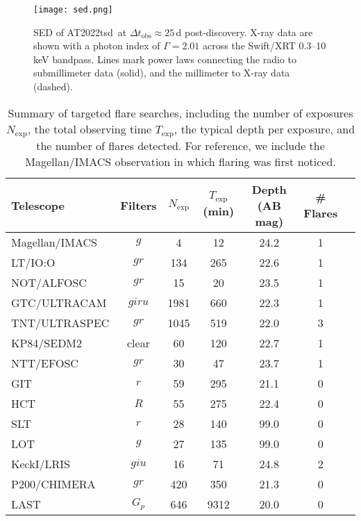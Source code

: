 \documentclass{nature_plusfigure}
\newcommand{\at}{AT2022tsd}
\begin{document}
\begin{extended_data}
\begin{figure}[!ht]
 \centering
\texttt{[image: sed.png]}
  \caption{SED of \at\ at $\Delta t_\mathrm{obs}\approx25\,$d post-discovery. X-ray data are shown with a photon index of $\Gamma=2.01$ across the Swift/XRT 0.3--10\,keV bandpass. Lines mark power laws connecting the radio to submillimeter data (solid), and the millimeter to X-ray data (dashed).}
 \label{fig:full-sed}
\end{figure}

\begin{table}
\begin{center}
\caption{Summary of targeted flare searches, including the number of exposures $N_\mathrm{exp}$, the total observing time $T_\mathrm{exp}$, the typical depth per exposure, and the number of flares detected. For reference, we include the Magellan/IMACS observation in which flaring was first noticed.}
\label{tab:flare-searches}
\begin{tabular}{lcccccc} 
\hline\hline
Telescope & Filters & $N_\mathrm{exp}$ & $T_\mathrm{exp}$ (min) & Depth (AB mag) & \# Flares \\
\hline
Magellan/IMACS & $g$ & 4 & 12 & 24.2 & 1 \\
LT/IO:O & $gr$ & 134 & 265 & 22.6 & 1 \\
NOT/ALFOSC & $gr$ & 15 & 20 & 23.5 & 1 \\
GTC/ULTRACAM & $giru$ & 1981 & 660 & 22.3 & 1 \\
TNT/ULTRASPEC & $gr$ & 1045 & 519 & 22.0 & 3 \\
KP84/SEDM2 & clear & 60 & 120 & 22.7 & 1 \\
NTT/EFOSC & $gr$ & 30 & 47 & 23.7 & 1 \\
GIT & $r$ & 59 & 295 & 21.1 & 0 \\
HCT & $R$ & 55 & 275 & 22.4 & 0 \\
SLT & $r$ & 28 & 140 & 99.0 & 0 \\
LOT & $g$ & 27 & 135 & 99.0 & 0 \\
KeckI/LRIS & $giu$ & 16 & 71 & 24.8 & 2 \\
P200/CHIMERA & $gr$ & 420 & 350 & 21.3 & 0 \\
LAST & $G_p$ & 646 & 9312 & 20.0 & 0 \\
\hline
\end{tabular}
\end{center}
\end{table}


\end{extended_data}
\end{document}
